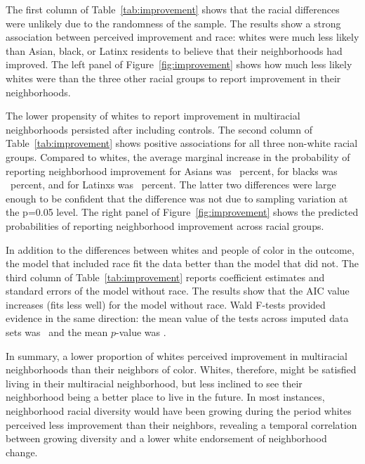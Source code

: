 \documentclass{baderart}
\begin{document}
The first column of Table~\ref{tab:improvement} shows that the racial differences were unlikely due to the randomness of the sample. The results show a strong association between perceived improvement and race: whites were much less likely than Asian, black, or Latinx residents to believe that their neighborhoods had improved. The left panel of Figure~\ref{fig:improvement} shows how much less likely whites were than the three other racial groups to report improvement in their neighborhoods. 



The lower propensity of whites to report improvement in multiracial neighborhoods persisted after including controls. The second column of Table~\ref{tab:improvement} shows positive associations for all three non-white racial groups. Compared to whites, the average marginal increase in the probability of reporting neighborhood improvement for Asians was \betamethreeapi~percent, for blacks was \betamethreeblack~percent, and for Latinxs was \betamethreelatino~percent. The latter two differences were large enough to be confident that the difference was not due to sampling variation at the p=0.05 level. The right panel of Figure~\ref{fig:improvement} shows the predicted probabilities of reporting neighborhood improvement across racial groups. 

In addition to the differences between whites and people of color in the outcome, the model that included race fit the data better than the model that did not. The third column of Table~\ref{tab:improvement} reports coefficient estimates and standard errors of the model without race. The results show that the AIC value increases (fits less well) for the model without race. Wald F-tests provided evidence in the same direction: the mean value of the tests across imputed data sets was \betWaldF~and the mean $p$-value was \betWaldp.

In summary, a lower proportion of whites perceived improvement in multiracial neighborhoods than their neighbors of color. Whites, therefore, might be satisfied living in their multiracial neighborhood, but less inclined to see their neighborhood being a better place to live in the future. In most instances, neighborhood racial diversity would have been growing during the period whites perceived less improvement than their neighbors, revealing a temporal correlation between growing diversity and a lower white endorsement of neighborhood change.
\end{document}
